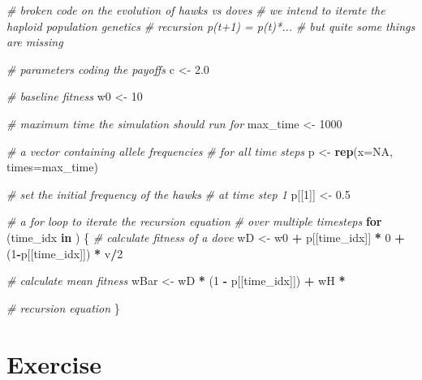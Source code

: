 \documentclass[
]{book}
\newenvironment{Shaded}{\begin{snugshade}}{\end{snugshade}}
\newcommand{\AttributeTok}[1]{\textcolor[rgb]{0.13,0.29,0.53}{#1}}
\newcommand{\CommentTok}[1]{\textcolor[rgb]{0.56,0.35,0.01}{\textit{#1}}}
\newcommand{\ConstantTok}[1]{\textcolor[rgb]{0.56,0.35,0.01}{#1}}
\newcommand{\ControlFlowTok}[1]{\textcolor[rgb]{0.13,0.29,0.53}{\textbf{#1}}}
\newcommand{\DecValTok}[1]{\textcolor[rgb]{0.00,0.00,0.81}{#1}}
\newcommand{\FloatTok}[1]{\textcolor[rgb]{0.00,0.00,0.81}{#1}}
\newcommand{\FunctionTok}[1]{\textcolor[rgb]{0.13,0.29,0.53}{\textbf{#1}}}
\newcommand{\NormalTok}[1]{#1}
\newcommand{\OtherTok}[1]{\textcolor[rgb]{0.56,0.35,0.01}{#1}}
\newcommand{\SpecialCharTok}[1]{\textcolor[rgb]{0.81,0.36,0.00}{\textbf{#1}}}
\begin{document}
\begin{Shaded}
\begin{Highlighting}[]
\CommentTok{\# broken code on the evolution of hawks vs doves}
\CommentTok{\# we intend to iterate the haploid population genetics}
\CommentTok{\# recursion p(t+1) = p(t)*...}
\CommentTok{\# but quite some things are missing }

\CommentTok{\# parameters coding the payoffs}
\NormalTok{c }\OtherTok{\textless{}{-}} \FloatTok{2.0}

\CommentTok{\# baseline fitness}
\NormalTok{w0 }\OtherTok{\textless{}{-}} \DecValTok{10}

\CommentTok{\# maximum time the simulation should run for}
\NormalTok{max\_time }\OtherTok{\textless{}{-}} \DecValTok{1000}

\CommentTok{\# a vector containing allele frequencies}
\CommentTok{\# for all time steps}
\NormalTok{p }\OtherTok{\textless{}{-}} \FunctionTok{rep}\NormalTok{(}\AttributeTok{x=}\ConstantTok{NA}\NormalTok{, }\AttributeTok{times=}\NormalTok{max\_time)}

\CommentTok{\# set the initial frequency of the hawks}
\CommentTok{\# at time step 1}
\NormalTok{p[[}\DecValTok{1}\NormalTok{]] }\OtherTok{\textless{}{-}} \FloatTok{0.5}

\CommentTok{\# a for loop to iterate the recursion equation}
\CommentTok{\# over multiple timesteps}
\ControlFlowTok{for}\NormalTok{ (time\_idx }\ControlFlowTok{in}\NormalTok{ )}
\NormalTok{\{}
    \CommentTok{\# calculate fitness of a dove}
\NormalTok{    wD }\OtherTok{\textless{}{-}}\NormalTok{ w0 }\SpecialCharTok{+}\NormalTok{ p[[time\_idx]] }\SpecialCharTok{*} \DecValTok{0} \SpecialCharTok{+}\NormalTok{ (}\DecValTok{1}\SpecialCharTok{{-}}\NormalTok{p[[time\_idx]]) }\SpecialCharTok{*}\NormalTok{ v}\SpecialCharTok{/}\DecValTok{2}

    \CommentTok{\# calculate mean fitness}
\NormalTok{    wBar }\OtherTok{\textless{}{-}}\NormalTok{ wD }\SpecialCharTok{*}\NormalTok{ (}\DecValTok{1} \SpecialCharTok{{-}}\NormalTok{ p[[time\_idx]]) }\SpecialCharTok{+}\NormalTok{ wH }\SpecialCharTok{*} 

    \CommentTok{\# recursion equation}
\NormalTok{\}}
\end{Highlighting}
\end{Shaded}

\section{Exercise}\label{exercise-3}
\end{document}
